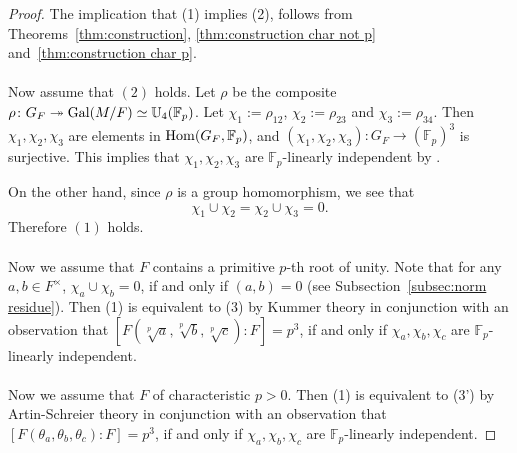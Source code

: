 \documentclass[12pt,leqno]{amsart}
\theoremstyle{plain}
\theoremstyle{definition}
\newcommand{\surj}{\twoheadrightarrow}
\newcommand{\F}{{\mathbb F}}
\newcommand{\U}{{\mathbb U}}
\begin{document}
\begin{proof} The implication that (1) implies (2), follows from Theorems~\ref{thm:construction}, \ref{thm:construction char not p} and~\ref{thm:construction char p}.
\\
\\
Now assume that $(2)$ holds.  Let $\rho$ be the composite $\rho\colon G_F\surj{\rm Gal}(M/F)\simeq \U_4(\F_p)$. Let $\chi_1:=\rho_{12}$, $\chi_2:=\rho_{23}$ and $\chi_3:=\rho_{34}$. Then $\chi_1, \chi_2,\chi_3$ are elements in ${\rm Hom}(G_F,\F_p)$, and $(\chi_1,\chi_2,\chi_3)\colon G_F\to (\F_p)^3$ is surjective. This implies that  $\chi_1,\chi_2,\chi_3$ are $\F_p$-linearly independent by \cite[Lemma 2.6]{MT4}. 

On the other hand, since $\rho$ is a group homomorphism, we see that 
\[
\chi_1\cup \chi_2 =\chi_2\cup\chi_3=0.
\]
Therefore $(1)$ holds.
\\
\\
Now we assume that $F$ contains a primitive $p$-th root of unity. Note that for any $a,b\in F^\times$, $\chi_a\cup\chi_b=0$, if and only if $(a,b)=0$ (see Subsection~\ref{subsec:norm residue}). 
Then (1) is equivalent to (3) by Kummer theory in conjunction with an observation that $[F(\sqrt[p]{a},\sqrt[p]{b}, \sqrt[p]{c}):F]=p^3$, if and only if  $\chi_a,\chi_b,\chi_c$ are $\F_p$-linearly independent.
\\
\\
Now we assume that $F$ of characteristic $p>0$. Then (1) is equivalent to (3') by Artin-Schreier theory in conjunction with an observation that $[F(\theta_{a},\theta_{b}, \theta_{c}):F]=p^3$, if and only if  $\chi_a,\chi_b,\chi_c$ are $\F_p$-linearly independent.
\end{proof}
\end{document}
